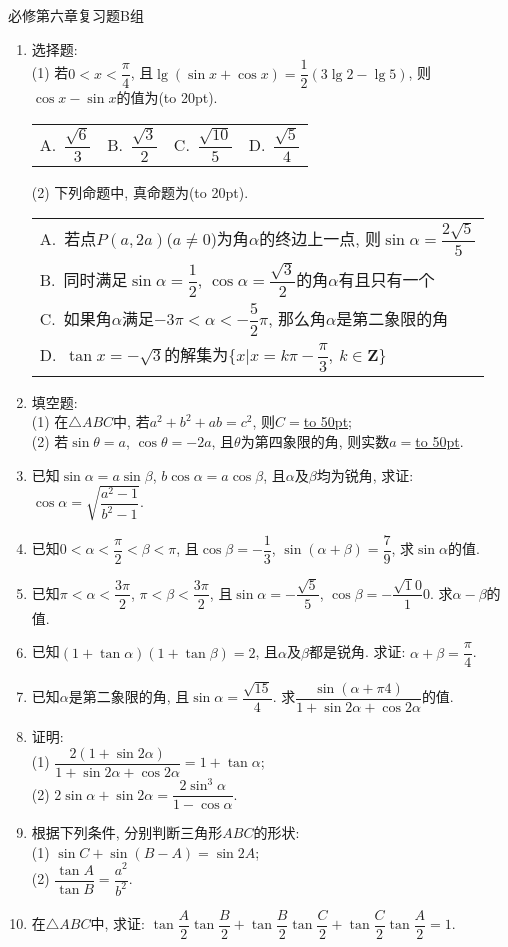 \documentclass[10pt,a4paper]{article}
\newcommand{\blank}[1]{\underline{\hbox to #1pt{}}}
\newcommand{\bracket}[1]{(\hbox to #1pt{})}
\newcommand{\onech}[4]{\par\begin{tabular}{p{.9\textwidth}}
A.~#1\\
B.~#2\\
C.~#3\\
D.~#4
\end{tabular}}
\newcommand{\fourch}[4]{\par\begin{tabular}{p{.23\textwidth}p{.23\textwidth}p{.23\textwidth}p{.23\textwidth}}
A.~#1 &B.~#2& C.~#3& D.~#4
\end{tabular}}
\begin{document}
必修第六章复习题B组
\begin{enumerate}[1.]

\item 选择题:\\
(1) 若$0<x<\dfrac\pi 4$, 且$\lg (\sin x+\cos x)=\dfrac12(3\lg 2-\lg 5)$, 则$\cos x-\sin x$的值为\bracket{20}.
\fourch{$\dfrac{\sqrt{6}}3$}{$\dfrac{\sqrt{3}}2$}{$\dfrac{\sqrt{10}}5$}{$\dfrac{\sqrt{5}}4$}
(2) 下列命题中, 真命题为\bracket{20}.
\onech{若点$P(a, 2a)$($a\ne 0$)为角$\alpha$的终边上一点, 则$\sin \alpha=\dfrac{2\sqrt 5}5$}
{同时满足$\sin \alpha=\dfrac 12$, $\cos \alpha=\dfrac{\sqrt3}2$的角$\alpha$有且只有一个}
{如果角$\alpha$满足$-3\pi <\alpha<-\dfrac 52\pi$, 那么角$\alpha$是第二象限的角}
{$\tan x=-\sqrt 3$的解集为$\{x|x=k\pi -\dfrac\pi 3, \  k\in \mathbf{Z}\}$}
\vspace*{3cm}
\item 填空题:\\
(1) 在$\triangle ABC$中, 若$a^2+b^2+ab=c^2$, 则$C=$\blank{50};\\
(2) 若$\sin \theta =a$, $\cos \theta =-2a$, 且$\theta$为第四象限的角, 则实数$a=$\blank{50}.\\
\vspace*{3cm}
\item 已知$\sin \alpha=a\sin \beta$, $b\cos \alpha=a\cos \beta$, 且$\alpha$及$\beta$均为锐角, 求证: $\cos \alpha= \sqrt{\dfrac{a^2-1}{b^2-1}}$.
\vspace*{3cm}
\item 已知$0<\alpha<\dfrac\pi 2<\beta<\pi$, 且$\cos \beta=-\dfrac13$, $\sin (\alpha+\beta)=\dfrac79$, 求$\sin \alpha$的值.
\vspace*{3cm}
\item 已知$\pi <\alpha<\dfrac{3\pi} 2$, $\pi <\beta<\dfrac{3\pi} 2$, 且$\sin \alpha=-\dfrac{\sqrt 5}5$, $\cos \beta=-\dfrac{\sqrt 10}10$. 求$\alpha-\beta$的值.
\vspace*{3cm}
\item 已知$(1+\tan \alpha)(1+\tan \beta)=2$, 且$\alpha$及$\beta$都是锐角. 求证: $\alpha+\beta=\dfrac\pi 4$.
\vspace*{3cm}
\item 已知$\alpha$是第二象限的角, 且$\sin \alpha=\dfrac{\sqrt {15}}4$. 求$\dfrac{\sin (\alpha+\pi 4)}{1+\sin 2\alpha+\cos 2\alpha}$的值.
\vspace*{3cm}
\item 证明:\\
(1) $\dfrac{2(1+\sin 2\alpha)}{1+\sin 2\alpha+\cos 2\alpha}=1+\tan \alpha$;\\
(2) $2\sin \alpha+\sin 2\alpha=\dfrac{2\sin^3\alpha}{1-\cos \alpha}$.
\vspace*{3cm}
\item 根据下列条件, 分别判断三角形$ABC$的形状:\\
(1) $\sin C+\sin (B-A)=\sin 2A$;\\
(2) $\dfrac{\tan A}{\tan B}=\dfrac{a^2}{b^2}$.
\vspace*{3cm}
\item 在$\triangle ABC$中, 求证: $\tan \dfrac A2\tan \dfrac B2+\tan \dfrac B2\tan\dfrac C2+\tan\dfrac C2\tan\dfrac A2=1$.
\vspace*{3cm}
\end{enumerate}
\end{document}
